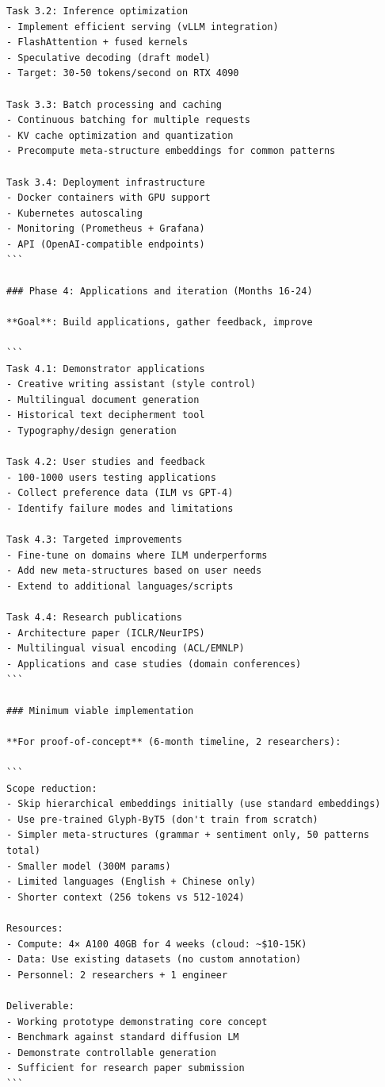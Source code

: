 \documentclass[11pt]{article}
\begin{document}
\begin{verbatim}
Task 3.2: Inference optimization
- Implement efficient serving (vLLM integration)
- FlashAttention + fused kernels
- Speculative decoding (draft model)
- Target: 30-50 tokens/second on RTX 4090

Task 3.3: Batch processing and caching
- Continuous batching for multiple requests
- KV cache optimization and quantization
- Precompute meta-structure embeddings for common patterns

Task 3.4: Deployment infrastructure
- Docker containers with GPU support
- Kubernetes autoscaling
- Monitoring (Prometheus + Grafana)
- API (OpenAI-compatible endpoints)
```

### Phase 4: Applications and iteration (Months 16-24)

**Goal**: Build applications, gather feedback, improve

```
Task 4.1: Demonstrator applications
- Creative writing assistant (style control)
- Multilingual document generation
- Historical text decipherment tool
- Typography/design generation

Task 4.2: User studies and feedback
- 100-1000 users testing applications
- Collect preference data (ILM vs GPT-4)
- Identify failure modes and limitations

Task 4.3: Targeted improvements
- Fine-tune on domains where ILM underperforms
- Add new meta-structures based on user needs
- Extend to additional languages/scripts

Task 4.4: Research publications
- Architecture paper (ICLR/NeurIPS)
- Multilingual visual encoding (ACL/EMNLP)
- Applications and case studies (domain conferences)
```

### Minimum viable implementation

**For proof-of-concept** (6-month timeline, 2 researchers):

```
Scope reduction:
- Skip hierarchical embeddings initially (use standard embeddings)
- Use pre-trained Glyph-ByT5 (don't train from scratch)
- Simpler meta-structures (grammar + sentiment only, 50 patterns total)
- Smaller model (300M params)
- Limited languages (English + Chinese only)
- Shorter context (256 tokens vs 512-1024)

Resources:
- Compute: 4× A100 40GB for 4 weeks (cloud: ~$10-15K)
- Data: Use existing datasets (no custom annotation)
- Personnel: 2 researchers + 1 engineer

Deliverable:
- Working prototype demonstrating core concept
- Benchmark against standard diffusion LM
- Demonstrate controllable generation
- Sufficient for research paper submission
```


\end{verbatim}
\end{document}
